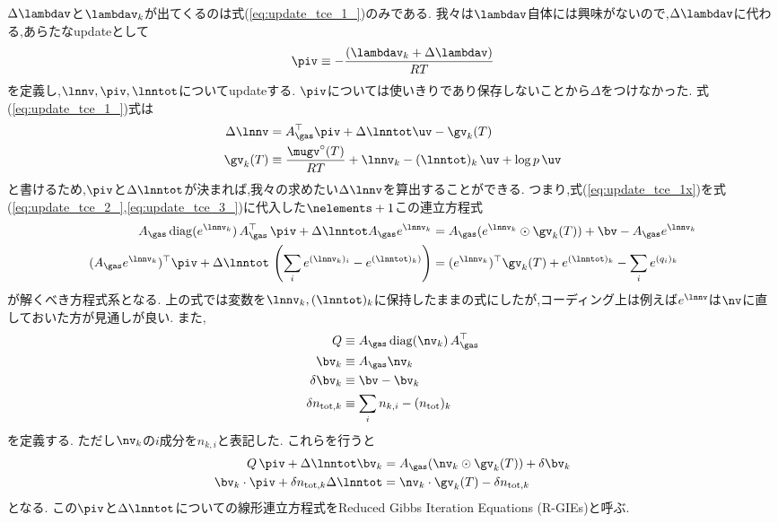 $\Delta \lambdav$と$\lambdav_k$が出てくるのは式(\ref{eq:update_tce_1_})のみである. 我々は$\lambdav$自体には興味がないので,$\Delta \lambdav$に代わる,あらたなupdateとして
\begin{align}
    \piv \equiv - \frac{(\lambdav_k + \Delta \lambdav)}{RT} 
\end{align}
を定義し,$\lnnv, \piv, \lnntot$についてupdateする. $\piv$については使いきりであり保存しないことから$\Delta$をつけなかった. 式(\ref{eq:update_tce_1_})式は
\begin{align}
\label{eq:update_tce_1x}
    \Delta \lnnv &=  A_\gas^\top \piv + \Delta \lnntot \uv - \gv_k(T) \\
    \gv_k (T) &\equiv \frac{\mugv^\circ(T)}{RT} + {\lnnv}_k - (\lnntot)_k \, \uv + \log{p} \, \uv 
\end{align}
と書けるため,$\piv$と$\Delta \lnntot$が決まれば,我々の求めたい$\Delta \lnnv$を算出することができる. つまり,式(\ref{eq:update_tce_1x})を式(\ref{eq:update_tce_2_},\ref{eq:update_tce_3_})に代入した$\nelements+1$この連立方程式
\begin{align}
    A_\gas \, \mathrm{diag} (e^{\lnnv_k}) \, A_\gas^\top \, \piv + \Delta \lnntot A_\gas e^{\lnnv_k} &= A_\gas (e^{\lnnv_k} \odot \gv_k (T) ) + \bv - A_\gas  e^{\lnnv_k} \\
    (A_\gas  e^{\lnnv_k})^\top \piv + \Delta \lnntot \, \left( \sum_i e^{(\lnnv_k)_i} - e^{(\lnntot)_k)} \right) &= (e^{\lnnv_k})^\top \gv_k(T) + e^{(\lnntot)_k} - \sum_i {e^{(q_i)_k}} 
\end{align}
が解くべき方程式系となる. 上の式では変数を$\lnnv_k, (\lnntot)_k$に保持したままの式にしたが,コーディング上は例えば$e^{\lnnv}$は$\nv$に直しておいた方が見通しが良い. また,
\begin{align}
    Q &\equiv  A_\gas \, \mathrm{diag} (\nv_k) \, A_\gas^\top \\
    \bv_k &\equiv A_\gas \nv_k \\
    \delta \bv_k &\equiv \bv - \bv_k \\
     \delta n_{\mathrm{tot}, k} &\equiv  \sum_i n_{k,i} - (n_\mathrm{tot})_{k}
\end{align}
を定義する. ただし$\nv_k$の$i$成分を$n_{k,i}$と表記した. これらを行うと
\begin{align}
\label{eq:rgie1}
   Q \, \piv + \Delta \lnntot \bv_k &= A_\gas ( \nv_k \odot \gv_k (T) ) + \delta \bv_k \\
\label{eq:rgie2}
\bv_k \cdot \piv + \delta n_{\mathrm{tot}, k} \Delta \lnntot &= \nv_k \cdot \gv_k(T) - \delta n_{\mathrm{tot}, k}
\end{align}
となる. この$\piv$と$\Delta \lnntot$についての線形連立方程式をReduced Gibbs Iteration Equations (R-GIEs)と呼ぶ\citep{gordon1994computer}. 

